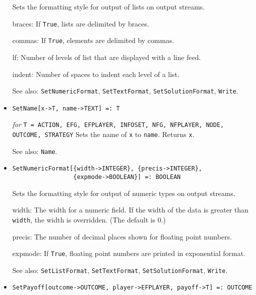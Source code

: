 \begin{itemize}
\bd
Sets the formatting style for output of lists on output streams.
\bd
\item [braces:] If \verb+True+, lists are delimited by braces.
\item [commas:] If \verb+True+, elements are delimited by commas.
\item [lf:] Number of levels of list that are displayed with a line feed.
\item [indent:] Number of spaces to indent each level of a list.
\ed
\item [See also:] \verb+SetNumericFormat+, \verb+SetTextFormat+,
\verb+SetSolutionFormat+, \verb+Write+.
\ed

\item{}
\protect \large \begin{verbatim}
SetName[x->T, name->TEXT] =: T
\end{verbatim}\normalsize

{\it for} {\tt T = ACTION, EFG, EFPLAYER, INFOSET, NFG, NFPLAYER,
NODE, OUTCOME, STRATEGY}
\bd
Sets the name of \verb+x+ to \verb+name+.  Returns \verb+x+.
\item [See also:] \verb+Name+.
\ed

\item{}
\protect \large \begin{verbatim}
SetNumericFormat[{width->INTEGER}, {precis->INTEGER},
                 {expmode->BOOLEAN}] =: BOOLEAN
\end{verbatim}\normalsize

\bd
Sets the formatting style for output of numeric types on output streams.
\bd
\item [width:] The width for a numeric field.  If the width of the
data is greater than \verb+width+, the width is overridden.  (The
default is 0.)
\item [precis:] The number of decimal places shown for floating point
numbers.
\item [expmode:] If \verb+True+, floating point numbers are printed in
exponential format.
\ed
\item [See also:] \verb+SetListFormat+, \verb+SetTextFormat+, 
\verb+SetSolutionFormat+, \verb+Write+.
\ed

\item{}
\protect \large \begin{verbatim}
SetPayoff[outcome->OUTCOME, player->EFPLAYER, payoff->T] =: OUTCOME
\end{verbatim}\normalsize


\end{itemize}
